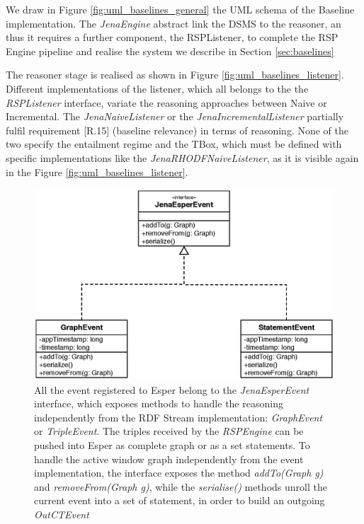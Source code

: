 We draw in Figure \ref{fig:uml_baselines_general} the UML schema of the Baseline implementation. The \textit{JenaEngine} abstract link the DSMS to the reasoner, an thus it requires a further component, the RSPListener, to complete the RSP Engine pipeline and realise the system we describe in Section \ref{sec:baselines}
 
The reasoner stage is realised as shown in Figure \ref{fig:uml_baselines_listener}. Different implementations of the listener, which all belongs to the the \textit{RSPListener} interface, variate the reasoning approaches between Naive or Incremental. The \textit{JenaNaiveListener} or the \textit{JenaIncrementalListener} partially fulfil requirement [R.15] (baseline relevance) in terms of reasoning. None of the two specify the entailment regime and the TBox, which must be defined with specific implementations like the \textit{JenaRHODFNaiveListener}, as it is visible again in the Figure \ref{fig:uml_baselines_listener}.

\begin{figure}[tbh]
  \centering
	\includegraphics[width=0.7\linewidth]{images/uml_baselines_events}
	\caption[Esper-level Graph based and Triple based - UML Schema]{ All the event registered to Esper belong to the \textit{JenaEsperEvent} interface, which exposes methods to handle the reasoning independently from the RDF Stream implementation:  \textit{GraphEvent} or \textit{TripleEvent}. The triples received by the \textit{RSPEngine} can be pushed into Esper as complete graph or as a set statements. To handle the active window graph independently from the event implementation, the interface exposes the method \textit{addTo(Graph g)} and \textit{removeFrom(Graph g)}, while the \textit{serialise()} methods unroll the current event into a set of statement, in order to build an outgoing \textit{OutCTEvent}}
  	\label{fig:uml_baselines_events}
\end{figure}


